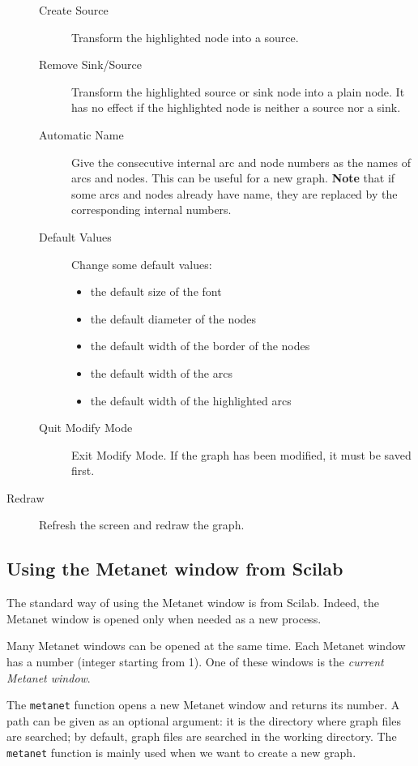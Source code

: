 \documentclass[11pt]{article}
\newcommand{\func}[1]{\texttt{#1}}
\begin{document}
\begin{description}
\begin{description}
  \item[Create Source] Transform the highlighted node into a source.
  \item[Remove Sink/Source] Transform the highlighted source or sink node
	into a plain node. It has no effect if the highlighted node is neither 
	a source nor a sink.
  \item[Automatic Name] Give the consecutive internal arc and node numbers as
	the names of arcs and nodes. This can be useful for a new graph.
	\textbf{Note} that if some arcs and nodes already have name, 
	they are replaced by the corresponding internal numbers.
  \item[Default Values] Change some default values:
	\begin{itemize}
                \item the default size of the font
                \item the default diameter of the nodes
                \item the default width of the border of the nodes
                \item the default width of the arcs
                \item the default width of the highlighted arcs
	\end{itemize}
  \item[Quit Modify Mode] Exit Modify Mode. If the graph has been
	modified, it must be saved first.
\end{description}
\item[Redraw] Refresh the screen and redraw the graph.
\end{description}

\subsection{Using the Metanet window from Scilab}\label{show}

The standard way of using the Metanet window is from
Scilab. Indeed, the Metanet window is opened only when needed as a
new process.

Many Metanet windows can be opened at the same time. Each Metanet
window has a number (integer starting from 1). One of these windows is
the \emph{current Metanet window}.

The \func{metanet} function opens a new Metanet window and returns its
number. A path can be given as an optional argument: it is the
directory where graph files are searched; by default, graph files are
searched in the working directory. The \func{metanet} function is
mainly used when we want to create a new graph.
\end{document}

